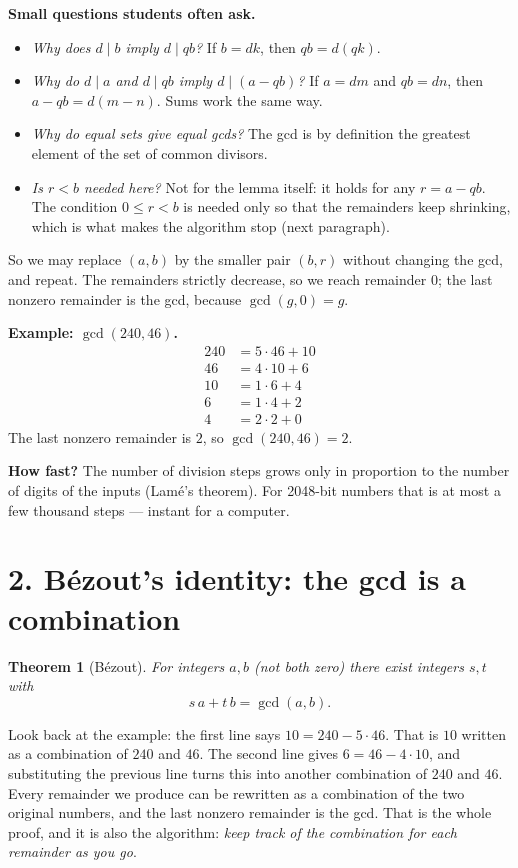 \documentclass[11pt]{article}
\newtheorem{theorem}{Theorem}
\begin{document}
\textbf{Small questions students often ask.}
\begin{itemize}[nosep]
\item \emph{Why does $d\mid b$ imply $d\mid qb$?} If $b=dk$, then $qb=d(qk)$.
\item \emph{Why do $d\mid a$ and $d\mid qb$ imply $d\mid(a-qb)$?} If $a=dm$ and $qb=dn$, then $a-qb=d(m-n)$. Sums work the same way.
\item \emph{Why do equal sets give equal gcds?} The gcd is by definition the greatest element of the set of common divisors.
\item \emph{Is $r<b$ needed here?} Not for the lemma itself: it holds for any $r=a-qb$. The condition $0\le r<b$ is needed only so that the remainders keep shrinking, which is what makes the algorithm stop (next paragraph).
\end{itemize}

So we may replace $(a,b)$ by the smaller pair $(b,r)$ without changing the gcd, and repeat. The remainders strictly decrease, so we reach remainder $0$; the last nonzero remainder is the gcd, because $\gcd(g,0)=g$.

\textbf{Example: $\gcd(240,46)$.}
\begin{align*}
240 &= 5\cdot 46 + 10\\
46 &= 4\cdot 10 + 6\\
10 &= 1\cdot 6 + 4\\
6 &= 1\cdot 4 + 2\\
4 &= 2\cdot 2 + 0
\end{align*}
The last nonzero remainder is $2$, so $\gcd(240,46)=2$.

\textbf{How fast?} The number of division steps grows only in proportion to the number of digits of the inputs (Lam\'e's theorem). For 2048-bit numbers that is at most a few thousand steps --- instant for a computer.

\hrulefill

\section*{2. B\'ezout's identity: the gcd is a combination}

\begin{theorem}[B\'ezout]
For integers $a,b$ (not both zero) there exist integers $s,t$ with
\[
s\,a+t\,b=\gcd(a,b).
\]
\end{theorem}

Look back at the example: the first line says $10=240-5\cdot46$. That is $10$ written as a combination of $240$ and $46$. The second line gives $6=46-4\cdot10$, and substituting the previous line turns this into another combination of $240$ and $46$. Every remainder we produce can be rewritten as a combination of the two original numbers, and the last nonzero remainder is the gcd. That is the whole proof, and it is also the algorithm: \emph{keep track of the combination for each remainder as you go}.
\end{document}
